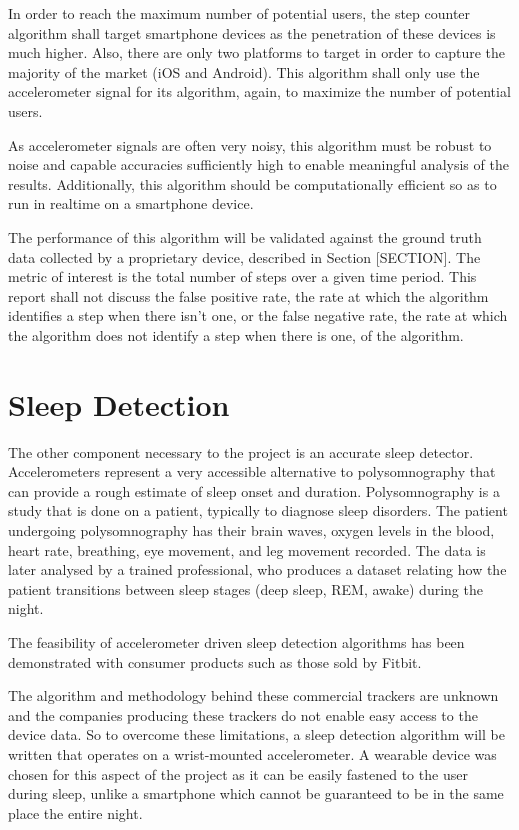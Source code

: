             In order to reach the maximum number of potential users, the step counter algorithm shall target smartphone devices as the penetration of these devices is much higher. Also, there are only two platforms to target in order to capture the majority of the market (iOS and Android). This algorithm shall only use the accelerometer signal for its algorithm, again, to maximize the number of potential users.

            As accelerometer signals are often very noisy, this algorithm must be robust to noise and capable accuracies sufficiently high to enable meaningful analysis of the results. Additionally, this algorithm should be computationally efficient so as to run in realtime on a smartphone device.

            The performance of this algorithm will be validated against the ground truth data collected by a proprietary device, described in Section [SECTION]. The metric of interest is the total number of steps over a given time period. This report shall not discuss the false positive rate, the rate at which the algorithm identifies a step when there isn't one, or the false negative rate, the rate at which the algorithm does not identify a step when there is one, of the algorithm.

        \section{Sleep Detection}

            The other component necessary to the project is an accurate sleep detector. Accelerometers represent a very accessible alternative to polysomnography that can provide a rough estimate of sleep onset and duration. Polysomnography is a study that is done on a patient, typically to diagnose sleep disorders. The patient undergoing polysomnography has their brain waves, oxygen levels in the blood, heart rate, breathing, eye movement, and leg movement recorded. The data is later analysed by a trained professional, who produces a dataset relating how the patient transitions between sleep stages (deep sleep, REM, awake) during the night.

            The feasibility of accelerometer driven sleep detection algorithms has been demonstrated with consumer products such as those sold by Fitbit.

            The algorithm and methodology behind these commercial trackers are unknown and the companies producing these trackers do not enable easy access to the device data. So to overcome these limitations, a sleep detection algorithm will be written that operates on a wrist-mounted accelerometer. A wearable device was chosen for this aspect of the project as it can be easily fastened to the user during sleep, unlike a smartphone which cannot be guaranteed to be in the same place the entire night.

